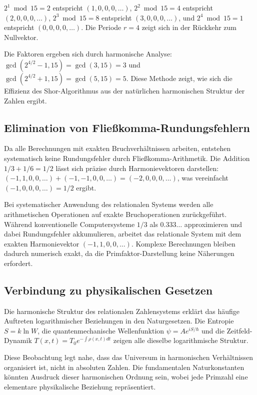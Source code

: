\documentclass[12pt,a4paper]{report}
\begin{document}
	$2^1 \bmod 15 = 2$ entspricht $(1, 0, 0, 0, \ldots)$, $2^2 \bmod 15 = 4$ entspricht $(2, 0, 0, 0, \ldots)$, $2^3 \bmod 15 = 8$ entspricht $(3, 0, 0, 0, \ldots)$, und $2^4 \bmod 15 = 1$ entspricht $(0, 0, 0, 0, \ldots)$. Die Periode $r = 4$ zeigt sich in der R{\"u}ckkehr zum Nullvektor.
	
	Die Faktoren ergeben sich durch harmonische Analyse: $\gcd(2^{4/2} - 1, 15) = \gcd(3, 15) = 3$ und $\gcd(2^{4/2} + 1, 15) = \gcd(5, 15) = 5$. Diese Methode zeigt, wie sich die Effizienz des Shor-Algorithmus aus der nat{\"u}rlichen harmonischen Struktur der Zahlen ergibt.
	
	\subsection{Elimination von Flie{\ss}komma-Rundungsfehlern}
	
	Da alle Berechnungen mit exakten Bruchverh{\"a}ltnissen arbeiten, entstehen systematisch keine Rundungsfehler durch Flie{\ss}komma-Arithmetik. Die Addition $1/3 + 1/6 = 1/2$ l{\"a}sst sich pr{\"a}zise durch Harmonievektoren darstellen: $(-1, 1, 0, 0, \ldots) + (-1, -1, 0, 0, \ldots) = (-2, 0, 0, 0, \ldots)$, was vereinfacht $(-1, 0, 0, 0, \ldots) = 1/2$ ergibt.
	
	Bei systematischer Anwendung des relationalen Systems werden alle arithmetischen Operationen auf exakte Bruchoperationen zur{\"u}ckgef{\"u}hrt. W{\"a}hrend konventionelle Computersysteme $1/3$ als $0.333\ldots$ approximieren und dabei Rundungsfehler akkumulieren, arbeitet das relationale System mit dem exakten Harmonievektor $(-1, 1, 0, 0, \ldots)$. Komplexe Berechnungen bleiben dadurch numerisch exakt, da die Primfaktor-Darstellung keine N{\"a}herungen erfordert.
	
	\subsection{Verbindung zu physikalischen Gesetzen}
	
	Die harmonische Struktur des relationalen Zahlensystems erkl{\"a}rt das h{\"a}ufige Auftreten logarithmischer Beziehungen in den Naturgesetzen. Die Entropie $S = k \ln W$, die quantenmechanische Wellenfunktion $\psi = A e^{iS/\hbar}$ und die Zeitfeld-Dynamik $T(x,t) = T_0 e^{-\int\rho(x,t)dt}$ zeigen alle dieselbe logarithmische Struktur.
	
	Diese Beobachtung legt nahe, dass das Universum in harmonischen Verh{\"a}ltnissen organisiert ist, nicht in absoluten Zahlen. Die fundamentalen Naturkonstanten k{\"o}nnten Ausdruck dieser harmonischen Ordnung sein, wobei jede Primzahl eine elementare physikalische Beziehung repr{\"a}sentiert.
	
\end{document}
